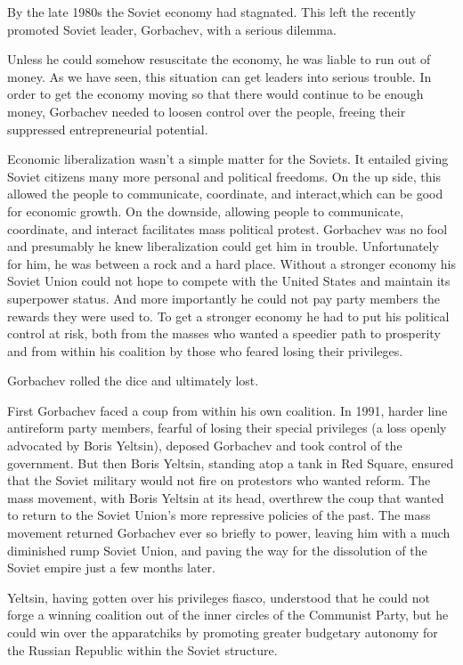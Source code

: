 \documentclass[10pt]{article}
\begin{document}
{\large By the late 1980s the Soviet economy had stagnated. This left the
recently promoted Soviet leader, Gorbachev, with a serious dilemma.}

{\large Unless he could somehow resuscitate the economy, he was liable to run
out of money. As we have seen, this situation can get leaders into serious
trouble. In order to get the economy moving so that there would continue to be
enough money, Gorbachev needed to loosen control over the people, freeing their
suppressed entrepreneurial potential.}

{\large Economic liberalization wasn't a simple matter for the Soviets. It
entailed giving Soviet citizens many more personal and political freedoms. On the
up side, this allowed the people to communicate, coordinate, and interact,which
can be good for economic growth. On the downside, allowing people to communicate,
coordinate, and interact facilitates mass political protest. Gorbachev was no
fool and presumably he knew liberalization could get him in trouble.
Unfortunately for him, he was between a rock and a hard place. Without a stronger
economy his Soviet Union could not hope to compete with the United States and
maintain its superpower status. And more importantly he could not pay party
members the rewards they were used to. To get a stronger economy he had to put
his political control at risk, both from the masses who wanted a speedier path to
prosperity and from within his coalition by those who feared losing their
privileges.}

{\large Gorbachev rolled the dice and ultimately lost.}

{\large First Gorbachev faced a coup from within his own coalition. In 1991,
harder line antireform party members, fearful of losing their special privileges
(a loss openly advocated by Boris Yeltsin), deposed Gorbachev and took control of
the government. But then Boris Yeltsin, standing atop a tank in Red Square,
ensured that the Soviet military would not fire on protestors who wanted reform.
The mass movement, with Boris Yeltsin at its head, overthrew the coup that wanted
to return to the Soviet Union's more repressive policies of the past. The mass
movement returned Gorbachev ever so briefly to power, leaving him with a much
diminished rump Soviet Union, and paving the way for the dissolution of the
Soviet empire just a few months later.}

{\large Yeltsin, having gotten over his privileges fiasco, understood that he
could not forge a winning coalition out of the inner circles of the Communist
Party, but he could win over the apparatchiks by promoting greater budgetary
autonomy for the Russian Republic within the Soviet structure.}
\end{document}
